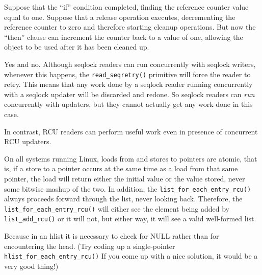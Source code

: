 
	  Suppose that the ``if'' condition completed, finding
	  the reference counter value equal to one.
	  Suppose that a release operation executes, decrementing
	  the reference counter to zero and therefore starting
	  cleanup operations.
	  But now the ``then'' clause can increment the counter
	  back to a value of one, allowing the object to be
	  used after it has been cleaned up.


Yes and no.
Although seqlock readers can run concurrently with
seqlock writers, whenever this happens, the {\tt read\_seqretry()}
primitive will force the reader to retry.
This means that any work done by a seqlock reader running concurrently
with a seqlock updater will be discarded and redone.
So seqlock readers can \emph{run} concurrently with updaters,
but they cannot actually get any work done in this case.

In contrast, RCU readers can perform useful work even in presence
of concurrent RCU updaters.


On all systems running Linux, loads from and stores
to pointers are atomic, that is, if a store to a pointer occurs at
the same time as a load from that same pointer, the load will return
either the initial value or the value stored, never some bitwise mashup
of the two.
In addition, the {\tt list\_for\_each\_entry\_rcu()} always proceeds
forward through the list, never looking back.
Therefore, the {\tt list\_for\_each\_entry\_rcu()} will either see
the element being added by {\tt list\_add\_rcu()} or it will not,
but either way, it will see a valid well-formed list.


Because in an hlist it is necessary to check for
NULL rather than for encountering the head.
(Try coding up a single-pointer {\tt hlist\_for\_each\_entry\_rcu()}
If you come up with a nice solution, it would be a very good thing!)

